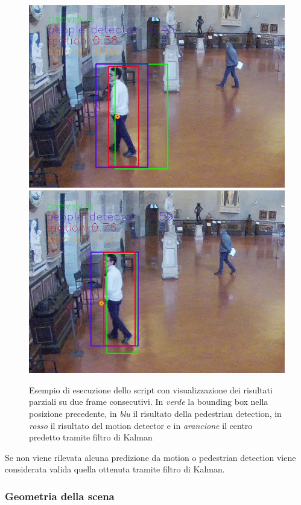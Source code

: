 \begin{figure}[h]
\centering
\includegraphics[width=.4\textwidth]{images/prediction1.jpg}\quad
\medskip
\includegraphics[width=.4\textwidth]{images/prediction2.jpg}\quad
\caption{Esempio di esecuzione dello script con visualizzazione dei risultati parziali su due frame consecutivi. In \emph{verde} la bounding box nella posizione precedente, in \emph{blu} il risultato della pedestrian detection, in \emph{rosso} il risultato del motion detector e in \emph{arancione} il centro predetto tramite filtro di Kalman}
\label{fig:prediction}
\end{figure}

Se non viene rilevata alcuna predizione da motion o pedestrian detection viene considerata valida quella ottenuta tramite filtro di Kalman.


\subsubsection{Geometria della scena}